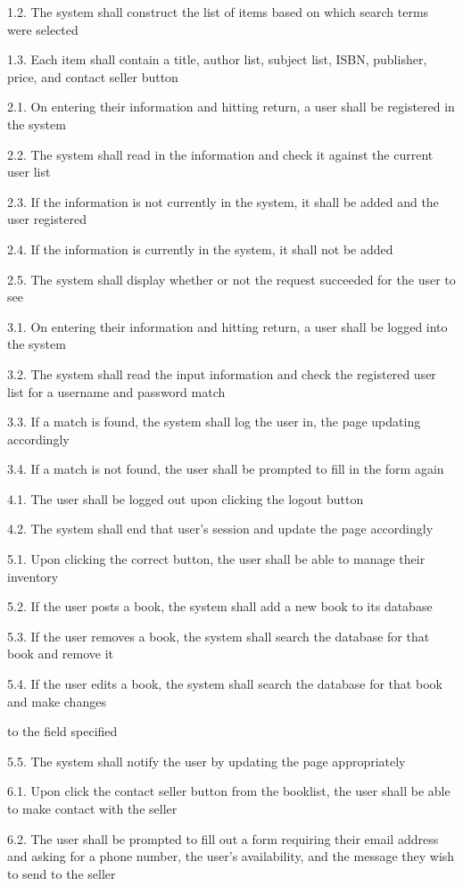 \documentclass[11pt]{article}
\begin{document}
1.2. The system shall construct the list of items based on which search terms were selected

1.3. Each item shall contain a title, author list, subject list, ISBN, publisher, price, and contact seller button

2.1. On entering their information and hitting return, a user shall be registered in the system

2.2. The system shall read in the information and check it against the current user list

2.3. If the information is not currently in the system, it shall be added and the user registered

2.4. If the information is currently in the system, it shall not be added

2.5. The system shall display whether or not the request succeeded for the user to see

3.1. On entering their information and hitting return, a user shall be logged into the system

3.2. The system shall read the input information and check the registered user list for a username and password match

3.3. If a match is found, the system shall log the user in, the page updating accordingly

3.4. If a match is not found, the user shall be prompted to fill in the form again

4.1. The user shall be logged out upon clicking the logout button

4.2. The system shall end that user’s session and update the page accordingly

5.1. Upon clicking the correct button, the user shall be able to manage their inventory

5.2. If the user posts a book, the system shall add a new book to its database

5.3. If the user removes a book, the system shall search the database for that book and remove it

5.4. If the user edits a book, the system shall search the database for that book and make changes 

to the field specified

5.5. The system shall notify the user by updating the page appropriately

6.1. Upon click the contact seller button from the booklist, the user shall be able to make contact with the seller

6.2. The user shall be prompted to fill out a form requiring their email address and asking for a phone number, the user’s availability, and the message they wish to send to the seller
\end{document}
